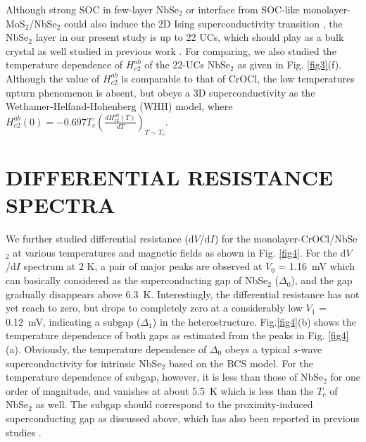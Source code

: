 \documentclass[%
 reprint,
superscriptaddress,
 amsmath,amssymb,
 aps,
]{revtex4-2}
\begin{document}
Although strong SOC in few-layer NbSe$_2$ or interface from SOC-like monolayer-MoS$_2$/NbSe$_2$ could also induce the 2D Ising superconductivity transition \cite{NbSe2, 2DNbSe2, MoS2/NbSe2}, the NbSe$_2$ layer in our present study is up to 22 UCs, which should play as a bulk crystal as well studied in previous work \cite{NbSe2}. For comparing, we also studied the temperature dependence of $H_{c2}^{ab}$ of the 22-UCs NbSe$_2$ as given in Fig. \ref{fig3}(f). Although the value of $H_{c2}^{ab}$ is comparable to that of CrOCl, the low temperatures upturn phenomenon is absent, but obeys a 3D superconductivity as the Wethamer-Helfand-Hohenberg (WHH) model, where $H_{c2}^{ab}(0)= -0.697T_c(\frac{dH_{c2}^{ab}(T)}{dT})_{T\sim T_c}$.


\section{DIFFERENTIAL RESISTANCE SPECTRA}

We further studied differential resistance (d$V$/d$I$) for the monolayer-CrOCl/NbSe$_2$ at various temperatures and magnetic fields as shown in Fig. \ref{fig4}. For the d$V$/d$I$ spectrum at 2 K, a pair of major peaks are observed at $V_0$ = 1.16~mV which can basically considered as the superconducting gap of NbSe$_2$ ($\Delta_0$), and the gap gradually disappears above 6.3~K. Interestingly, the differential resistance has not yet reach to zero, but drops to completely zero at a considerably low $V_1$ = 0.12~mV, indicating a subgap ($\Delta_1$) in the heterostructure. Fig.\ref{fig4}(b) shows the temperature dependence of both gaps as estimated from the peaks in Fig. \ref{fig4}(a). Obviously, the temperature dependence of $\Delta_0$ obeys a typical $s$-wave superconductivity for intrinsic NbSe$_2$ based on the BCS model. For the temperature dependence of subgap, however, it is less than those of NbSe$_2$ for one order of magnitude, and vanishes at about 5.5~K which is less than the $T_c$ of NbSe$_2$ as well. The subgap should correspond to the proximity-induced superconducting gap as discussed above, which has also been reported in previous studies \cite{WTe2,BiSe}.
\end{document}

